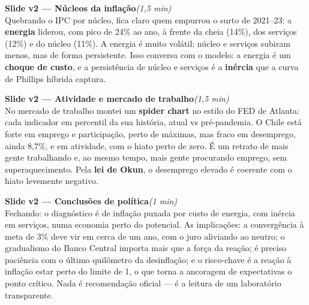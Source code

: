 \documentclass[11pt,a4paper]{article}
\newcommand{\slide}[3]{\medskip\noindent{\color{azul}\rule{3pt}{14pt}}\;
  \textbf{Slide #1 --- #2}\hfill\textit{(#3)}\\[1mm]}
\begin{document}
\slide{v2}{Núcleos da inflação}{1,5 min}
Quebrando o IPC por núcleo, fica claro quem empurrou o surto de 2021--23: a \textbf{energia} liderou,
com pico de 24\% ao ano, à frente da cheia (14\%), dos serviços (12\%) e do núcleo (11\%). A energia é
muito volátil; núcleo e serviços subiram menos, mas de forma persistente. Isso conversa com o modelo: a
energia é um \textbf{choque de custo}, e a persistência de núcleo e serviços é a \textbf{inércia} que a
curva de Phillips híbrida captura.

\slide{v2}{Atividade e mercado de trabalho}{1,5 min}
No mercado de trabalho montei um \textbf{spider chart} no estilo do FED de Atlanta: cada indicador em
percentil da sua história, atual vs pré-pandemia. O Chile está forte em emprego e participação, perto
de máximas, mas fraco em desemprego, ainda 8,7\%, e em atividade, com o hiato perto de zero. É um
retrato de mais gente trabalhando e, ao mesmo tempo, mais gente procurando emprego, sem
superaquecimento. Pela \textbf{lei de Okun}, o desemprego elevado é coerente com o hiato levemente
negativo.

\slide{v2}{Conclusões de política}{1 min}
Fechando: o diagnóstico é de inflação puxada por custo de energia, com inércia em serviços, numa
economia perto do potencial. As implicações: a convergência à meta de 3\% deve vir em cerca de um ano,
com o juro aliviando ao neutro; o gradualismo do Banco Central importa mais que a força da reação; é
preciso paciência com o último quilômetro da desinflação; e o risco-chave é a reação à inflação estar
perto do limite de 1, o que torna a ancoragem de expectativas o ponto crítico. Nada é recomendação
oficial --- é a leitura de um laboratório transparente.
\end{document}
